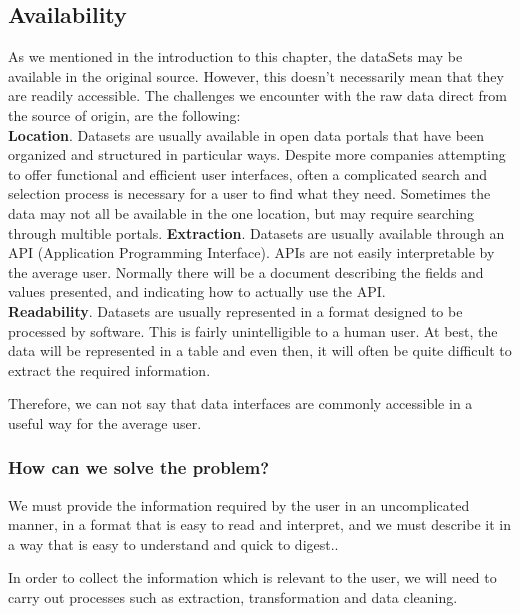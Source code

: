 \subsection{Availability}
    
As we mentioned in the introduction to this chapter, the dataSets may be available in the original source. However, this doesn't necessarily
mean that they are readily accessible.
The challenges we encounter with the raw data direct from the source of origin, are the following: \\   
 
\textbf{Location}. Datasets are usually available in open data portals that have been organized and structured in particular ways.
Despite more companies attempting to offer functional and efficient user interfaces, often a complicated search and selection process is necessary for a user to find what they need. Sometimes the data may not all be available in the one location, but may require searching through multible portals.
\textbf{Extraction}. Datasets are usually available through an API (Application Programming Interface). APIs are not easily interpretable by the average user. Normally there will be a document describing the fields and values presented, and indicating how to actually use the API. \\

\textbf{Readability}. Datasets are usually represented in a format designed to be processed by software. This is fairly unintelligible to a human user. At best,
the data will be represented in a table and even then, it will often be quite difficult to extract the required information.

Therefore, we can not say that data interfaces are commonly accessible in a useful way for the average user. \\

\subsubsection{How can we solve the problem?} 

We must provide the information required by the user in an uncomplicated manner, in a format that is easy to read and interpret, and we must describe it in a way that is easy to understand and quick to digest..

In order to collect the information which is relevant to the user, we will need to carry out processes such as extraction, transformation and
data cleaning.
 
